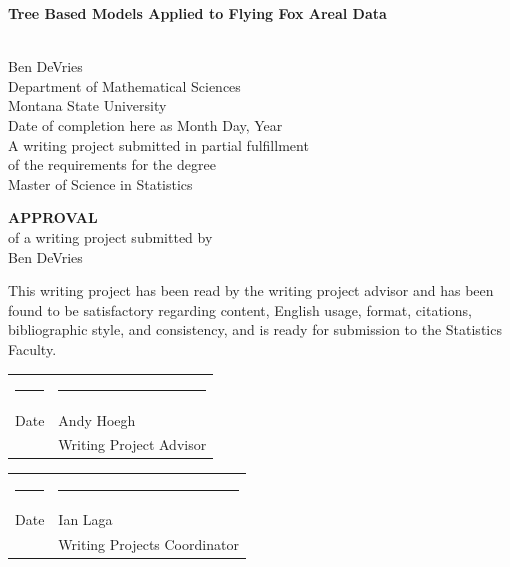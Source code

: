 \documentclass[
  12pt,
  letterpaper,
  DIV=11,
  numbers=noendperiod]{scrartcl}
\author{}
\date{}
\newcommand{\myname}{Ben DeVries}
\newcommand{\myadvisor}{Andy Hoegh}
\newcommand{\wprojcoord}{Ian Laga}  %
\newcommand{\maintitle}{Tree Based Models Applied to Flying Fox Areal Data}
\newcommand{\mydate}{Date of completion here as Month Day, Year}
\begin{document}
\begin{singlespace}

\begin{titlepage}
\null
\vspace{2.in}
\begin{center}
{\LARGE\bfseries \maintitle} \vspace{.1in}

\vspace{.05in}
{\LARGE\bfseries $\;$} \\ [.5in]
{\Large  \myname \\
\vspace{0.5cm}
Department of Mathematical Sciences \\
Montana State University \\ [.5in]}
\mydate \\ [1.in]
A writing project submitted in partial fulfillment\\
of the requirements for the degree\\[.25in]
Master of Science in Statistics
\end{center}
\end{titlepage}

\begin{titlepage}
\null
\vspace{2.in}
\begin{center}
{\bfseries\huge APPROVAL}\\[1.in]
of a writing project submitted by\\[.25in]
\myname \\[1.in]
\end{center}
\noindent
This writing project has been read by the writing project advisor and
has been found to be satisfactory regarding content, English usage,
format, citations, bibliographic style, and consistency, and is ready
for submission to the Statistics Faculty.

\vspace{.3in}
\begin{center}
\begin{tabular}{ll}
\rule{2.75in}{.03in} & \rule{2.75in}{.03in} \\
Date& \myadvisor \\
& Writing Project Advisor \\
\end{tabular}
\end{center}

\vspace{1cm}

\begin{center}
\begin{tabular}{ll}
\rule{2.75in}{.03in} & \rule{2.75in}{.03in} \\
Date& \wprojcoord \\
& Writing Projects Coordinator \\
\end{tabular}
\end{center}

\end{titlepage}
\end{singlespace}
\end{document}
